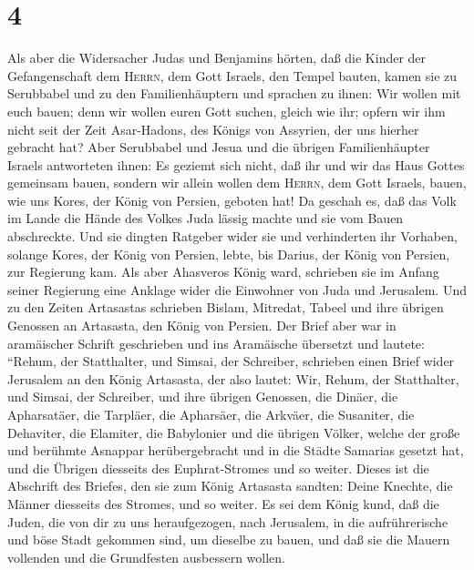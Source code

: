 \hypertarget{section-3}{%
\section{4}\label{section-3}}

 Als aber die Widersacher Judas und Benjamins hörten, daß
die Kinder der Gefangenschaft dem \textsc{Herrn}, dem Gott Israels, den
Tempel bauten,  kamen sie zu Serubbabel und zu den
Familienhäuptern und sprachen zu ihnen: Wir wollen mit euch bauen; denn
wir wollen euren Gott suchen, gleich wie ihr; opfern wir ihm nicht seit
der Zeit Asar-Hadons, des Königs von Assyrien, der uns hierher gebracht
hat?  Aber Serubbabel und Jesua und die übrigen
Familienhäupter Israels antworteten ihnen: Es geziemt sich nicht, daß
ihr und wir das Haus Gottes gemeinsam bauen, sondern wir allein wollen
dem \textsc{Herrn}, dem Gott Israels, bauen, wie uns Kores, der König
von Persien, geboten hat!  Da geschah es, daß das Volk im
Lande die Hände des Volkes Juda lässig machte und sie vom Bauen
abschreckte.  Und sie dingten Ratgeber wider sie und
verhinderten ihr Vorhaben, solange Kores, der König von Persien, lebte,
bis Darius, der König von Persien, zur Regierung kam.  Als
aber Ahasveros König ward, schrieben sie im Anfang seiner Regierung eine
Anklage wider die Einwohner von Juda und Jerusalem.  Und
zu den Zeiten Artasastas schrieben Bislam, Mitredat, Tabeel und ihre
übrigen Genossen an Artasasta, den König von Persien. Der Brief aber war
in aramäischer Schrift geschrieben und ins Aramäische übersetzt und
lautete:  ``Rehum, der Statthalter, und Simsai, der
Schreiber, schrieben einen Brief wider Jerusalem an den König Artasasta,
der also lautet:  Wir, Rehum, der Statthalter, und Simsai,
der Schreiber, und ihre übrigen Genossen, die Dinäer, die Apharsatäer,
die Tarpläer, die Apharsäer, die Arkväer, die Susaniter, die Dehaviter,
die Elamiter, die Babylonier und die übrigen Völker, 
welche der große und berühmte Asnappar herübergebracht und in die Städte
Samarias gesetzt hat, und die Übrigen diesseits des Euphrat-Stromes und
so weiter.  Dieses ist die Abschrift des Briefes, den sie
zum König Artasasta sandten: Deine Knechte, die Männer diesseits des
Stromes, und so weiter.  Es sei dem König kund, daß die
Juden, die von dir zu uns heraufgezogen, nach Jerusalem, in die
aufrührerische und böse Stadt gekommen sind, um dieselbe zu bauen, und
daß sie die Mauern vollenden und die Grundfesten ausbessern wollen.
